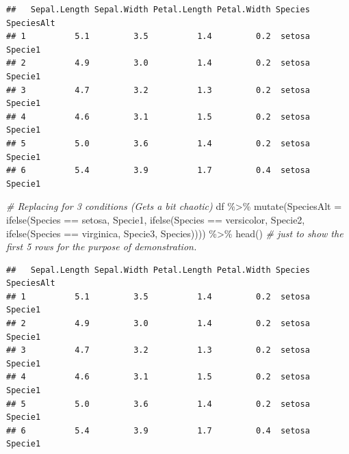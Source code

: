 \documentclass[
]{book}
\newenvironment{Shaded}{\begin{snugshade}}{\end{snugshade}}
\newcommand{\AttributeTok}[1]{\textcolor[rgb]{0.77,0.63,0.00}{#1}}
\newcommand{\CommentTok}[1]{\textcolor[rgb]{0.56,0.35,0.01}{\textit{#1}}}
\newcommand{\FunctionTok}[1]{\textcolor[rgb]{0.00,0.00,0.00}{#1}}
\newcommand{\NormalTok}[1]{#1}
\newcommand{\SpecialCharTok}[1]{\textcolor[rgb]{0.00,0.00,0.00}{#1}}
\newcommand{\StringTok}[1]{\textcolor[rgb]{0.31,0.60,0.02}{#1}}
\begin{document}
\begin{verbatim}
##   Sepal.Length Sepal.Width Petal.Length Petal.Width Species SpeciesAlt
## 1          5.1         3.5          1.4         0.2  setosa    Specie1
## 2          4.9         3.0          1.4         0.2  setosa    Specie1
## 3          4.7         3.2          1.3         0.2  setosa    Specie1
## 4          4.6         3.1          1.5         0.2  setosa    Specie1
## 5          5.0         3.6          1.4         0.2  setosa    Specie1
## 6          5.4         3.9          1.7         0.4  setosa    Specie1
\end{verbatim}

\begin{Shaded}
\begin{Highlighting}[]
\CommentTok{\# Replacing for 3 conditions (Gets a bit chaotic)}
\NormalTok{df }\SpecialCharTok{\%\textgreater{}\%} 
  \FunctionTok{mutate}\NormalTok{(}\AttributeTok{SpeciesAlt =} \FunctionTok{ifelse}\NormalTok{(Species }\SpecialCharTok{==} \StringTok{\textquotesingle{}setosa\textquotesingle{}}\NormalTok{, }\StringTok{\textquotesingle{}Specie1\textquotesingle{}}\NormalTok{, }
                             \FunctionTok{ifelse}\NormalTok{(Species }\SpecialCharTok{==} \StringTok{\textquotesingle{}versicolor\textquotesingle{}}\NormalTok{, }\StringTok{\textquotesingle{}Specie2\textquotesingle{}}\NormalTok{,}
                                    \FunctionTok{ifelse}\NormalTok{(Species }\SpecialCharTok{==} \StringTok{\textquotesingle{}virginica\textquotesingle{}}\NormalTok{, }\StringTok{\textquotesingle{}Specie3\textquotesingle{}}\NormalTok{, Species)))) }\SpecialCharTok{\%\textgreater{}\%} 
  \FunctionTok{head}\NormalTok{()  }\CommentTok{\# just to show the first 5 rows for the purpose of demonstration.}
\end{Highlighting}
\end{Shaded}

\begin{verbatim}
##   Sepal.Length Sepal.Width Petal.Length Petal.Width Species SpeciesAlt
## 1          5.1         3.5          1.4         0.2  setosa    Specie1
## 2          4.9         3.0          1.4         0.2  setosa    Specie1
## 3          4.7         3.2          1.3         0.2  setosa    Specie1
## 4          4.6         3.1          1.5         0.2  setosa    Specie1
## 5          5.0         3.6          1.4         0.2  setosa    Specie1
## 6          5.4         3.9          1.7         0.4  setosa    Specie1
\end{verbatim}
\end{document}
